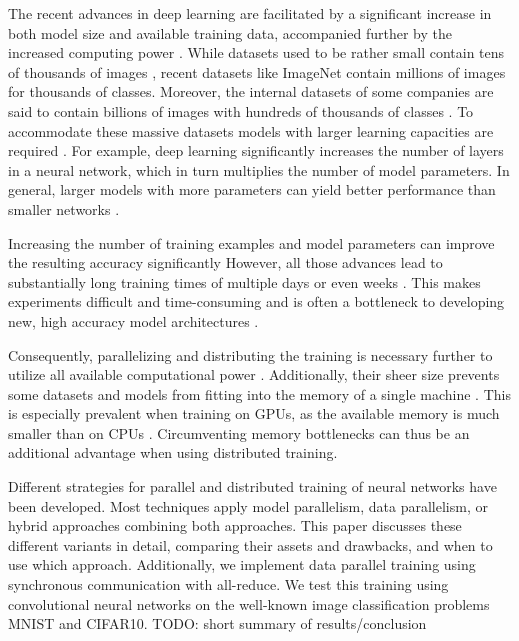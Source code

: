 \documentclass[conference,compsoc,a4paper]{IEEEtran}
\begin{document}
The recent advances in deep learning are facilitated by a significant increase in both model size and available training data, accompanied further by the increased computing power \cite{chen2016-Revisiting-distributed-synchronous-SGD,chilimbi2014-Project-Adam}.
%
While datasets used to be rather small contain tens of thousands of images \cite{lecun1998gradient,krizhevsky2009CIFAR10}, recent datasets like ImageNet \cite{imagenet_cvpr09} contain millions of images for thousands of classes.
Moreover, the internal datasets of some companies are said to contain billions of images with hundreds of thousands of classes \cite{iandola2016-Firecaffe}.
%
To accommodate these massive datasets models with larger learning capacities are required \cite{krizhevsky2012-AlexNet}.
For example, deep learning significantly increases the number of layers in a neural network, which in turn multiplies the number of model parameters.
In general, larger models with more parameters can yield better performance than smaller networks \cite{coates2013-DL-COTS-HPC,dean2012-Large-scale-distributed,krizhevsky2012-AlexNet}.


Increasing the number of training examples and model parameters can improve the resulting accuracy significantly \cite{dean2012-Large-scale-distributed}
However, all those advances lead to substantially long training times of multiple days or even weeks \cite{jin2016-How-to-scale,chilimbi2014-Project-Adam}.
This makes experiments difficult and time-consuming \cite{yadan2013-Multi-GPU-Training,jiang2018-FiLayer} and is often a bottleneck to developing new, high accuracy model architectures \cite{iandola2016-Firecaffe}.

Consequently, parallelizing and distributing the training is necessary further to utilize all available computational power \cite{jiang2018-FiLayer,recht2011-Hogwild}.
Additionally, their sheer size prevents some datasets and models from fitting into the memory of a single machine \cite{recht2011-Hogwild,dean2012-Large-scale-distributed}.
This is especially prevalent when training on GPUs, as the available memory is much smaller than on CPUs \cite{dean2012-Large-scale-distributed}.
Circumventing memory bottlenecks can thus be an additional advantage when using distributed training.

Different strategies for parallel and distributed training of neural networks have been developed.
Most techniques apply model parallelism, data parallelism, or hybrid approaches combining both approaches.
This paper discusses these different variants in detail, comparing their assets and drawbacks, and when to use which approach.
Additionally, we implement data parallel training using synchronous communication with all-reduce.
We test this training using convolutional neural networks on the well-known image classification problems MNIST and CIFAR10.
TODO: short summary of results/conclusion %
\end{document}
